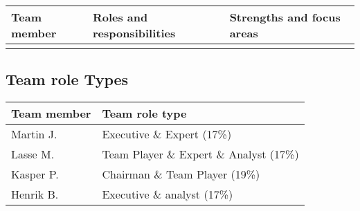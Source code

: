 \begin{table}
    \centering
    \begin{tabular}{l|l|l}
        \rowcolor{Gray}
        \textbf{Team member} & \textbf{Roles and responsibilities} & \textbf{Strengths and focus areas}\\\hline
                             & &
    \end{tabular}
    \label{tab:resources}
\end{table}

\subsection{Team role Types}

\begin{table}
    \centering
    \begin{tabular}{l|l}
        \rowcolor{Gray}
        \textbf{Team member} & \textbf{Team role type}\\\hline
        Martin J.            & Executive \& Expert (17\%) \\
        Lasse M.             & Team Player \& Expert \& Analyst (17\%) \\
        Kasper P.            & Chairman \& Team Player (19\%) \\
        Henrik B.            & Executive \& analyst (17\%)
    \end{tabular}
    \label{tab:roleTypes}
\end{table}
